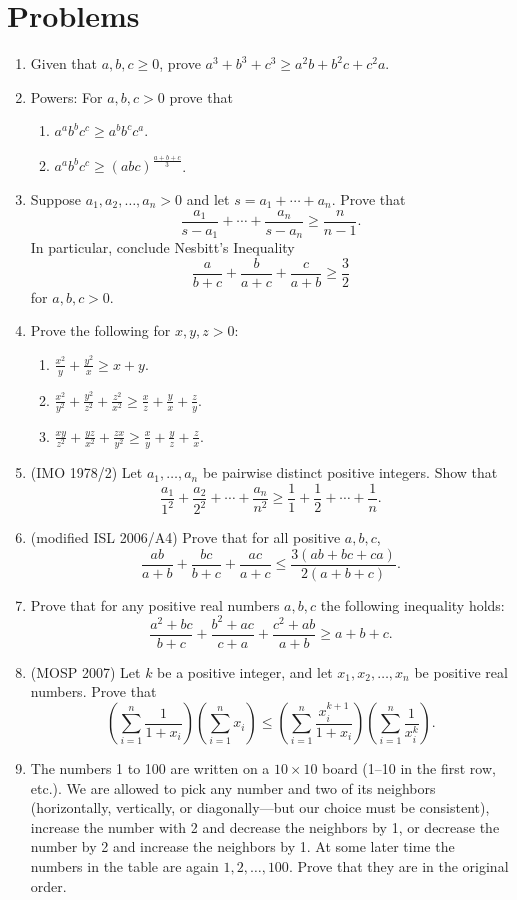 \section{Problems}
\begin{enumerate}
\item Given that $a,b,c\ge 0$, prove $a^3+b^3+c^3\ge a^2 b+b^2 c+c^2 a$.
\item Powers: For $a,b,c>0$ prove that
\begin{enumerate}
\item $a^ab^bc^c\geq a^bb^cc^a$.
\item $a^ab^bc^c\geq (abc)^{\frac {a+b+c}3}$.
\end{enumerate}
\item Suppose $a_1,a_2,\ldots, a_n>0$ and let $s=a_1+\cdots +a_n$. Prove that
\[
\frac{a_1}{s-a_1}+\cdots +\frac{a_n}{s-a_n}\ge \frac{n}{n-1}.
\]
In particular, conclude Nesbitt's Inequality
\[
\frac{a}{b+c}+\frac{b}{a+c}+\frac{c}{a+b}\ge \frac 32
\]
for $a,b,c>0$.
\item Prove the following for $x,y,z>0$:
\begin{enumerate}
\item $\frac{x^2}{y}+\frac{y^2}{x}\ge x+y$.
\item $\frac{x^2}{y^2}+\frac{y^2}{z^2}+\frac{z^2}{x^2}\geq \frac xz+\frac yx+\frac zy$.
\item $\frac{xy}{z^2}+\frac{yz}{x^2}+\frac{zx}{y^2}\geq \frac xy+\frac yz+\frac zx$.
\end{enumerate}
\item (IMO 1978/2) Let $a_1,\ldots, a_n$ be pairwise distinct positive integers. Show that
\[\frac{a_1}{1^2}+\frac{a_2}{2^2}+\cdots +\frac{a_n}{n^2}
\geq \frac{1}{1}+\frac{1}{2}+\cdots + \frac{1}{n}.\]
\item (modified ISL 2006/A4) Prove that for all positive $a,b,c$,
\[\frac{ab}{a+b}+\frac{bc}{b+c}+\frac{ac}{a+c}\leq \frac{3(ab+bc+ca)}{2(a+b+c)}.\]
\item Prove that for any positive real numbers $a,b,c$ the following inequality holds:
\[\frac{a^2+bc}{b+c}+\frac{b^2+ac}{c+a}+\frac{c^2+ab}{a+b}\geq a+b+c.\]
\item (MOSP 2007) Let $k$ be a positive integer, and let $x_1,x_2,\ldots, x_n$ be positive real numbers. Prove that
\[\left(\sum_{i=1}^n \frac1{1+x_i}\right)\left(\sum_{i=1}^n x_i\right)
\leq \left(\sum_{i=1}^n \frac{x_i^{k+1}}{1+x_i}\right)\left(\sum_{i=1}^n \frac1{x_i^k}\right).\]
\item The numbers 1 to 100 are written on a $10\times 10$ board (1--10 in the first row, etc.). We are allowed to pick any number and two of its neighbors (horizontally, vertically, or diagonally---but our choice must be consistent), increase the number with 2 and decrease the neighbors by 1, or decrease the number by 2 and increase the neighbors by 1. At some later time the numbers in the table are again $1,2, \ldots ,100$. Prove that they are in the original order.
\end{enumerate}

